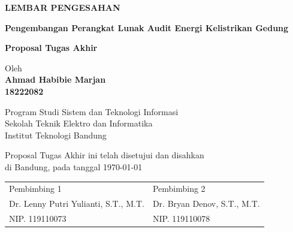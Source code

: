 \documentclass[12pt,a4paper,oneside]{book}
\begin{document}
\newpage
\thispagestyle{empty}
\begin{center}
  \textbf{\large LEMBAR PENGESAHAN}\\[1cm]
  \vspace*{1.5cm}
    
  {\large\bfseries Pengembangan Perangkat Lunak Audit Energi Kelistrikan Gedung}\\
     \vspace{2cm}

  {\Large \textbf{Proposal Tugas Akhir}}\\


  \vspace{1.5cm}
    
    
  {\large Oleh}\\[0.3cm]
    \textbf{
    {\large Ahmad Habibie Marjan}\\
    {\large 18222082}
  }\\
    
  \vspace{0.5cm}
 
  {\large Program Studi Sistem dan Teknologi Informasi}\\
  {\large Sekolah Teknik Elektro dan Informatika}\\
  {\large Institut Teknologi Bandung}\\

  \vspace{1.5cm}

  Proposal Tugas Akhir ini telah disetujui dan disahkan\\ 
  di Bandung, pada tanggal \today\\[1cm]

  \begin{tabular}{>{\centering\arraybackslash}p{7cm} >{\centering\arraybackslash}p{7cm}}
    Pembimbing 1 & Pembimbing 2  \\[3cm]
    Dr. Lenny Putri Yulianti, S.T., M.T. & Dr. Bryan Denov, S.T., M.T.   \\[0.2cm]
    NIP. 119110073 & NIP. 119110078
  \end{tabular}

\end{center}

\vspace{1cm}
\noindent
\end{document}
